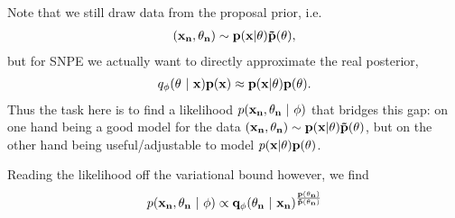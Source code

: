 \documentclass[10pt,english]{article}
\begin{document}
Note that we still draw data from the proposal prior, i.e.
\begin{align}
(\bf{x}_n, \theta_n) \sim p(x|\theta)\tilde{p}(\theta),\nonumber
\end{align} 
but for SNPE we actually want to directly approximate the real posterior,
\begin{align}
q_\phi(\theta \ | \ \bf{x}) p(\bf{x}) \approx p(x |\theta) p(\theta). \nonumber
\end{align}
Thus the task here is to find a likelihood $p( \bf{x}_n, \theta_n \ | \ \phi)$ that bridges this gap: 
on one hand being a good model for the data $(\bf{x}_n, \theta_n) \sim p(\bf{x}|\theta)\tilde{p}(\theta)$, but on the other hand being useful/adjustable to model $p(\bf{x} |\theta) p(\theta)$.

Reading the likelihood off the variational bound however, we find
\begin{align}
p( \bf{x}_n, \theta_n \ | \ \phi) \propto q_\phi(\theta_n \ | \ \bf{x}_n)^\frac{p(\theta_n)}{\tilde{p}(\theta_n)}
\label{eq:SNPE_likelihood}
\end{align}
\end{document}
